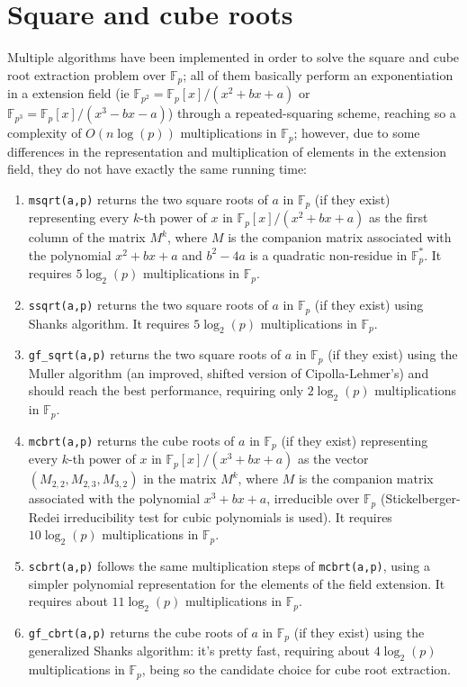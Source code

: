 \documentclass[a4paper,11pt,leqno,fleqn]{artikel3}
\begin{document}
\section*{Square and cube roots}
Multiple algorithms have been implemented in order to solve the square and cube root extraction problem over $\mathbb{F}_p$; all of them basically perform an exponentiation in a extension field (ie $\mathbb{F}_{p^2}=\mathbb{F}_{p}[x]/(x^2+bx+a)$ or $\mathbb{F}_{p^3}=\mathbb{F}_{p}[x]/(x^3-bx-a)$) through a repeated-squaring scheme, reaching so a complexity of $O(n \log(p))$ multiplications in $\mathbb{F}_p$; however, due to some differences in the representation and multiplication of elements in the extension field, they do not have exactly the same running time:
\begin{enumerate}
\item \verb!msqrt(a,p)! returns the two square roots of $a$ in $\mathbb{F}_p$ (if they exist) representing every $k$-th power of $x$ in $\mathbb{F}_{p}[x]/(x^2+bx+a)$ as the first column of the matrix $M^k$, where $M$ is the companion matrix associated with the polynomial $x^2+bx+a$ and $b^2-4a$ is a quadratic non-residue in $\mathbb{F}_p^*$. It requires $5 \log_2(p)$ multiplications in $\mathbb{F}_p$.
\item \verb!ssqrt(a,p)! returns the two square roots of $a$ in $\mathbb{F}_p$ (if they exist) using Shanks algorithm. It requires $5 \log_2(p)$ multiplications in $\mathbb{F}_p$.
\item \verb!gf_sqrt(a,p)! returns the two square roots of $a$ in $\mathbb{F}_p$ (if they exist) using the Muller algorithm (an improved, shifted version of Cipolla-Lehmer's) and should reach the best performance, requiring only $2 \log_2(p)$ multiplications in $\mathbb{F}_p$.
\item \verb!mcbrt(a,p)! returns the cube roots of $a$ in $\mathbb{F}_p$ (if they exist) representing every $k$-th power of $x$ in $\mathbb{F}_{p}[x]/(x^3+bx+a)$ as the vector $(M_{2,2},M_{2,3},M_{3,2})$ in the matrix $M^k$, where $M$ is the companion matrix associated with the polynomial $x^3+bx+a$, irreducible over $\mathbb{F}_p$ (Stickelberger-Redei irreducibility test for cubic polynomials is used). It requires $10 \log_2(p)$ multiplications in $\mathbb{F}_p$.
\item \verb!scbrt(a,p)! follows the same multiplication steps of \verb!mcbrt(a,p)!, using a simpler polynomial representation for the elements of the field extension. It requires about $11 \log_2(p)$ multiplications in $\mathbb{F}_p$.
\item \verb!gf_cbrt(a,p)! returns the cube roots of $a$ in $\mathbb{F}_p$ (if they exist) using the generalized Shanks algorithm: it's pretty fast, requiring about $4 \log_2(p)$ multiplications in $\mathbb{F}_p$, being so the candidate choice for cube root extraction.
\end{enumerate}
\end{document}
